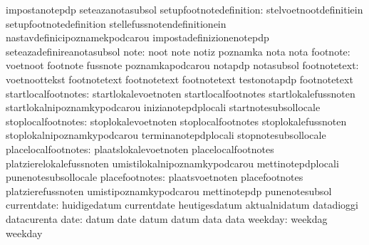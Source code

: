                                   impostanotepdp                   seteazanotasubsol
         setupfootnotedefinition: stelvoetnootdefinitiein          setupfootnotedefinition
                                  stellefussnotendefinitionein     nastavdefinicipoznamekpodcarou
                                  impostadefinizionenotepdp        seteazadefinireanotasubsol
                            note: noot                             note
                                  notiz                            poznamka
                                  nota                             nota
                        footnote: voetnoot                         footnote
                                  fussnote                         poznamkapodcarou
                                  notapdp                          notasubsol
                    footnotetext: voetnoottekst                    footnotetext
                                  footnotetext                     footnotetext
                                  testonotapdp                     footnotetext
             startlocalfootnotes: startlokalevoetnoten             startlocalfootnotes
                                  startlokalefussnoten             startlokalnipoznamkypodcarou
                                  inizianotepdplocali              startnotesubsollocale
              stoplocalfootnotes: stoplokalevoetnoten              stoplocalfootnotes
                                  stoplokalefussnoten              stoplokalnipoznamkypodcarou
                                  terminanotepdplocali             stopnotesubsollocale
             placelocalfootnotes: plaatslokalevoetnoten            placelocalfootnotes
                                  platzierelokalefussnoten         umistilokalnipoznamkypodcarou
                                  mettinotepdplocali               punenotesubsollocale
                  placefootnotes: plaatsvoetnoten                  placefootnotes
                                  platzierefussnoten               umistipoznamkypodcarou
                                  mettinotepdp                     punenotesubsol
                     currentdate: huidigedatum                     currentdate
                                  heutigesdatum                    aktualnidatum
                                  datadioggi                       datacurenta
                            date: datum                            date
                                  datum                            datum
                                  data                             data
                         weekday: weekdag                          weekday
